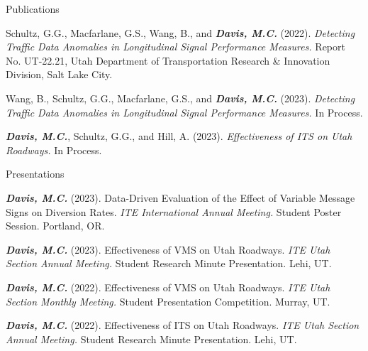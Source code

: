 \documentclass{resume} %
\begin{document}

\begin{rSection}{Publications}

Schultz, G.G., Macfarlane, G.S., Wang, B., and {\bf \em Davis, M.C.} (2022). {\em Detecting Traffic Data Anomalies in Longitudinal Signal Performance Measures.} Report No. UT-22.21, Utah Department of Transportation Research \& Innovation Division, Salt Lake City.

Wang, B., Schultz, G.G., Macfarlane, G.S., and {\bf \em Davis, M.C.} (2023). {\em Detecting Traffic Data Anomalies in Longitudinal Signal Performance Measures.} In Process.

{\bf \em Davis, M.C.}, Schultz, G.G., and Hill, A. (2023). {\em 
Effectiveness of ITS on Utah Roadways.} In Process.

\end{rSection}


% 
% 
% 
% 

\clearpage
\begin{rSection}{Presentations}

{\bf \em Davis, M.C.} (2023). {Data-Driven Evaluation of the Effect of Variable Message Signs on Diversion Rates.} {\em ITE International Annual Meeting.} Student Poster Session. Portland, OR.

{\bf \em Davis, M.C.} (2023). {Effectiveness of VMS on Utah Roadways.} {\em ITE Utah Section Annual Meeting.} Student Research Minute Presentation. Lehi, UT.

{\bf \em Davis, M.C.} (2022). {Effectiveness of VMS on Utah Roadways.} {\em ITE Utah Section Monthly Meeting.} Student Presentation Competition. Murray, UT.

{\bf \em Davis, M.C.} (2022). {Effectiveness of ITS on Utah Roadways.} {\em ITE Utah Section Annual Meeting.} Student Research Minute Presentation. Lehi, UT. 

\end{rSection}
\end{document}
